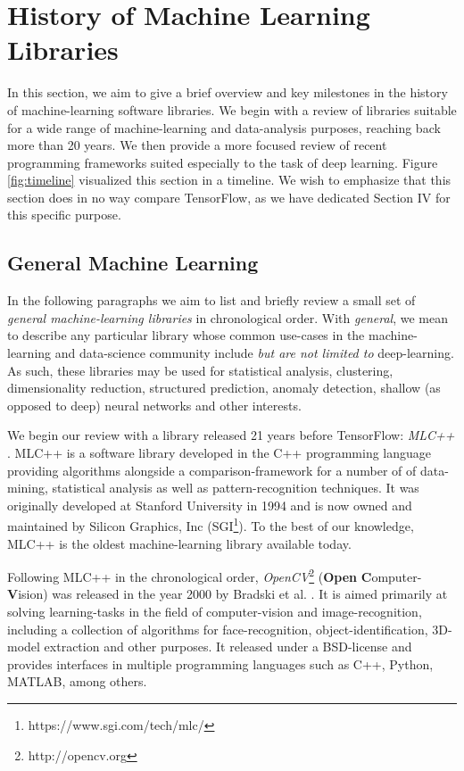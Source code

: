\section{History of Machine Learning Libraries}\label{sec:history}

In this section, we aim to give a brief overview and key milestones in the
history of machine-learning software libraries. We begin with a review of
libraries suitable for a wide range of machine-learning and data-analysis
purposes, reaching back more than 20 years. We then provide a more focused
review of recent programming frameworks suited especially to the task of deep
learning. Figure \ref{fig:timeline} visualized this section in a timeline. We
wish to emphasize that this section does in no way compare TensorFlow, as we
have dedicated Section IV for this specific purpose.

\subsection{General Machine Learning}\label{sec:history-general}

In the following paragraphs we aim to list and briefly review a small set of
\emph{general machine-learning libraries} in chronological order. With
\emph{general}, we mean to describe any particular library whose common
use-cases in the machine-learning and data-science community include \emph{but
  are not limited to} deep-learning. As such, these libraries may be used for
statistical analysis, clustering, dimensionality reduction, structured
prediction, anomaly detection, shallow (as opposed to deep) neural networks and
other interests.

We begin our review with a library released 21 years before TensorFlow:
\emph{MLC++} \cite{mlcpp}. MLC++ is a software library developed in the C++
programming language providing algorithms alongside a comparison-framework for a
number of of data-mining, statistical analysis as well as pattern-recognition
techniques. It was originally developed at Stanford University in 1994 and is
now owned and maintained by Silicon Graphics, Inc
(SGI\footnote{https://www.sgi.com/tech/mlc/}). To the best of our knowledge,
MLC++ is the oldest machine-learning library available today.

Following MLC++ in the chronological order,
\emph{OpenCV}\footnote{http://opencv.org} (\textbf{Open}
\textbf{C}omputer-\textbf{V}ision) was released in the year 2000 by Bradski et
al. \cite{opencv}. It is aimed primarily at solving learning-tasks in the field
of computer-vision and image-recognition, including a collection of algorithms
for face-recognition, object-identification, 3D-model extraction and other
purposes. It released under a BSD-license and provides interfaces in multiple
programming languages such as C++, Python, MATLAB, among others.

